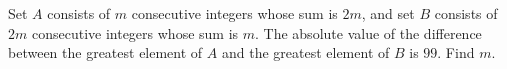 Set $A$ consists of $m$ consecutive integers whose sum is $2m$, and set $B$ consists of $2m$ consecutive integers whose sum is $m$. The absolute value of the difference between the greatest element of $A$ and the greatest element of $B$ is $99$. Find $m$.